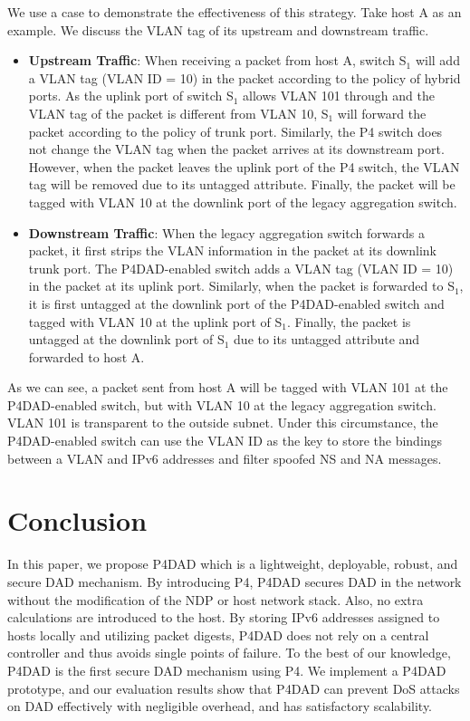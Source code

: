 \documentclass[a4paper,fleqn]{cas-dc}
\begin{document}
            We use a case to demonstrate the effectiveness of this strategy. Take host A as an example. We discuss the VLAN tag of its upstream and downstream traffic.
            \begin{itemize}
                \item \textbf{Upstream Traffic}: When receiving a packet from host A, switch S$_1$ will add a VLAN tag (VLAN ID = 10) in the packet according to the policy of hybrid ports. As the uplink port of switch S$_1$ allows VLAN 101 through and the VLAN tag of the packet is different from VLAN 10, S$_1$ will forward the packet according to the policy of trunk port. Similarly, the P4 switch does not change the VLAN tag when the packet arrives at its downstream port. However, when the packet leaves the uplink port of the P4 switch, the VLAN tag will be removed due to its untagged attribute. Finally, the packet will be tagged with VLAN 10 at the downlink port of the legacy aggregation switch.

                \item \textbf{Downstream Traffic}: When the legacy aggregation switch forwards a packet, it first strips the VLAN information in the packet at its downlink trunk port. The P4DAD-enabled switch adds a VLAN tag (VLAN ID = 10) in the packet at its uplink port. Similarly, when the packet is forwarded to S$_1$, it is first untagged at the downlink port of the P4DAD-enabled switch and tagged with VLAN 10 at the uplink port of S$_1$. Finally, the packet is untagged at the downlink port of S$_1$ due to its untagged attribute and forwarded to host A.
            \end{itemize}

            As we can see, a packet sent from host A will be tagged with VLAN 101 at the P4DAD-enabled switch, but with VLAN 10 at the legacy aggregation switch. VLAN 101 is transparent to the outside subnet. Under this circumstance, the P4DAD-enabled switch can use the VLAN ID as the key to store the bindings between a VLAN and IPv6 addresses and filter spoofed NS and NA messages.





\section{Conclusion}\label{sec:conclusion}
    In this paper, we propose P4DAD which is a lightweight, deployable, robust, and secure DAD mechanism. 
    By introducing P4, P4DAD secures DAD in the network without the modification of the NDP or host network stack. Also, no extra calculations are introduced to the host. By storing IPv6 addresses assigned to hosts locally and utilizing packet digests, P4DAD does not rely on a central controller and thus avoids single points of failure. 
    To the best of our knowledge, P4DAD is the first secure DAD mechanism using P4. We implement a P4DAD prototype, and our evaluation results show that P4DAD can prevent DoS attacks on DAD effectively with negligible overhead, and has satisfactory scalability. 
\end{document}
